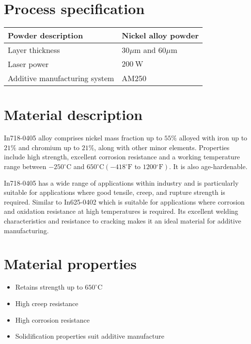 \documentclass[10pt]{article}
\begin{document}
\section*{Process specification}
\begin{center}
\begin{tabular}{|l|l|}
\hline
Powder description & Nickel alloy powder \\
\hline
Layer thickness & $30 \mu \mathrm{m}$ and $60 \mu \mathrm{m}$ \\
\hline
Laser power & $200 \mathrm{~W}$ \\
\hline
Additive manufacturing system & AM250 \\
\hline
\end{tabular}
\end{center}

\section*{Material description}
In718-0405 alloy comprises nickel mass fraction up to $55 \%$ alloyed with iron up to $21 \%$ and chromium up to $21 \%$, along with other minor elements. Properties include high strength, excellent corrosion resistance and a working temperature range between $-250^{\circ} \mathrm{C}$ and $650^{\circ} \mathrm{C}\left(-418^{\circ} \mathrm{F}\right.$ to $\left.1200{ }^{\circ} \mathrm{F}\right)$. It is also age-hardenable.

In718-0405 has a wide range of applications within industry and is particularly suitable for applications where good tensile, creep, and rupture strength is required. Similar to In625-0402 which is suitable for applications where corrosion and oxidation resistance at high temperatures is required. Its excellent welding characteristics and resistance to cracking makes it an ideal material for additive manufacturing.

\section*{Material properties}
\begin{itemize}
  \item Retains strength up to $650^{\circ} \mathrm{C}$

  \item High creep resistance

  \item High corrosion resistance

  \item Solidification properties suit additive manufacture

\end{itemize}
\end{document}
